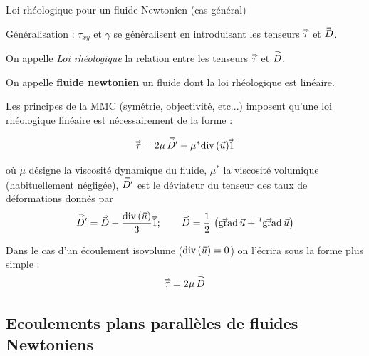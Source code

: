 \begin{frame}{Loi rhéologique pour un fluide Newtonien (cas général)}

\small

\bigskip

Généralisation : $\tau_{xy}$ et $\dot{\gamma}$ se généralisent en introduisant les tenseurs $\accentset{\Rightarrow}{\tau}$  et $\accentset{\Rightarrow}{D}$.

\medskip
\pause

On appelle {\em Loi rhéologique} la relation entre les tenseurs $\accentset{\Rightarrow}{\tau}$ et  $\accentset{\Rightarrow}{D}$.

\medskip
\pause

On appelle \textbf{fluide newtonien} un fluide dont la loi rhéologique est linéaire.



\medskip
\pause

Les principes de la MMC (symétrie, objectivité, etc...) imposent qu'une loi rhéologique linéaire 
est nécessairement de la forme :

\[
	\accentset{\Rightarrow}{\tau} = 2 \mu \, \accentset{\Rightarrow}{D'} + \mu^* \mbox{\rm div}\,(\vec{u}) \accentset{\Rightarrow}{1}
\] 

où $\mu$ désigne la viscosité dynamique du fluide, $\mu^*$ la viscosité volumique (habituellement négligée),
$\accentset{\Rightarrow}{D'}$ est le déviateur du tenseur des taux de déformations donnés par
\[
\accentset{\Rightarrow}{D'} = \accentset{\Rightarrow}{D} - \frac{\mbox{\rm div}\,(\vec{u})}{3}  \accentset{\Rightarrow}{1} ; 
\qquad 
	\accentset{\Rightarrow}{D} = \frac{1}{2}\, \left ( \accentset{\Rightarrow}{\mbox{\rm gra}}\mbox{\rm d}\!\ \vec{u} + \,^t\accentset{\Rightarrow}{\mbox{\rm gra}}\mbox{\rm d}\!\ \vec{u} \right )
\] 

Dans le cas d'un écoulement isovolume ($\mbox{\rm div}\,(\vec{u}) = 0$) 
on l'écrira sous la forme plus simple :
\[
\accentset{\Rightarrow}{\tau} = 2 \mu \, \accentset{\Rightarrow}{D} 
\]


\end{frame}

%
\subsection{Ecoulements plans parallèles de fluides Newtoniens}
%



